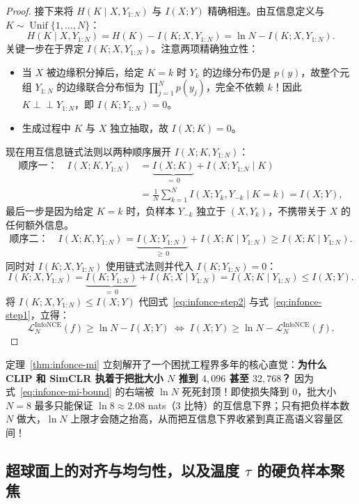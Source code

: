 \begin{thmBox}
\begin{proof}
接下来将 $H(K \mid X, Y_{1:N})$ 与 $I(X; Y)$ 精确相连。由互信息定义与 $K \sim \operatorname{Unif}\{1,\dots,N\}$：
\begin{equation}
  H(K \mid X, Y_{1:N}) = H(K) - I(K; X, Y_{1:N}) = \ln N - I(K; X, Y_{1:N}).
  \label{eq:infonce-step2}
\end{equation}
关键一步在于界定 $I(K; X, Y_{1:N})$。注意两项精确独立性：
\begin{itemize}
  \item 当 $X$ 被边缘积分掉后，给定 $K = k$ 时 $Y_k$ 的边缘分布仍是 $p(y)$，故整个元组 $Y_{1:N}$ 的边缘联合分布恒为 $\prod_{j=1}^N p(y_j)$，完全不依赖 $k$！因此 $K \perp\!\!\!\perp Y_{1:N}$，即 $I(K; Y_{1:N}) = 0$。
  \item 生成过程中 $K$ 与 $X$ 独立抽取，故 $I(X; K) = 0$。
\end{itemize}
现在用互信息链式法则以两种顺序展开 $I(X; K, Y_{1:N})$：
\begin{align*}
  \text{顺序一：}\quad I(X; K, Y_{1:N})
  &= \underbrace{I(X; K)}_{=\,0} + I(X; Y_{1:N} \mid K) \\
  &= \frac{1}{N}\sum_{k=1}^{N} I(X; Y_k, Y_{-k} \mid K = k) = I(X; Y),
\end{align*}
最后一步是因为给定 $K=k$ 时，负样本 $Y_{-k}$ 独立于 $(X, Y_k)$，不携带关于 $X$ 的任何额外信息。
\begin{align*}
  \text{顺序二：}\quad I(X; K, Y_{1:N})
  &= \underbrace{I(X; Y_{1:N})}_{\ge\, 0} + I(X; K \mid Y_{1:N})
   \ge I(X; K \mid Y_{1:N}).
\end{align*}
同时对 $I(K; X, Y_{1:N})$ 使用链式法则并代入 $I(K; Y_{1:N}) = 0$：
\[
  I(K; X, Y_{1:N}) = \underbrace{I(K; Y_{1:N})}_{=\,0} + I(K; X \mid Y_{1:N}) = I(X; K \mid Y_{1:N}) \le I(X; Y).
\]
将 $I(K; X, Y_{1:N}) \le I(X; Y)$ 代回式~\eqref{eq:infonce-step2} 与式~\eqref{eq:infonce-step1}，立得：
\[
  \mathcal{L}_N^{\mathrm{InfoNCE}}(f) \ge \ln N - I(X; Y)
  \;\iff\;
  I(X; Y) \ge \ln N - \mathcal{L}_N^{\mathrm{InfoNCE}}(f).
\]
\end{proof}
\end{thmBox}

定理~\ref{thm:infonce-mi} 立刻解开了一个困扰工程界多年的核心直觉：\textbf{为什么 CLIP 和 SimCLR 执着于把批大小 $N$ 推到 $4{,}096$ 甚至 $32{,}768$？} 因为式~\eqref{eq:infonce-mi-bound} 的右端被 $\ln N$ 死死封顶！即使损失降到 $0$，批大小 $N = 8$ 最多只能保证 $\ln 8 \approx 2.08$ nats（$3$ 比特）的互信息下界；只有把负样本数 $N$ 做大，$\ln N$ 上限才会随之抬高，从而把互信息下界收紧到真正高语义容量区间！

\subsection{超球面上的对齐与均匀性，以及温度 $\tau$ 的硬负样本聚焦}

